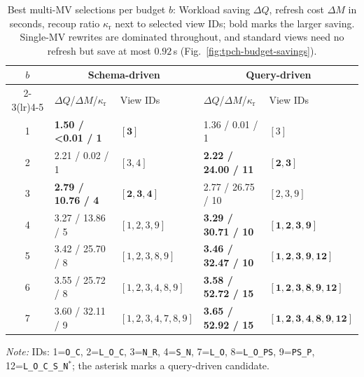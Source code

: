 \documentclass[sigconf]{acmart}
\begin{document}
\begin{table}[t]
  \centering
  \caption{Best multi-MV selections per budget $b$: Workload saving $\Delta Q$, refresh cost $\Delta M$ in seconds, recoup ratio $\kappa_{\mathrm r}$ next to selected view IDs; bold marks the larger saving. Single-MV rewrites are dominated throughout, and standard views need no refresh but save at most $0.92$\,s (Fig.~\ref{fig:tpch-budget-savings}).}
  \label{tab:tpch-budgets}
  \small
  \setlength{\tabcolsep}{4pt}
  \begin{tabular}{c l l l l}
    \toprule
    $b$ & \multicolumn{2}{c}{Schema-driven} & \multicolumn{2}{c}{Query-driven} \\
    \cmidrule(lr){2-3}\cmidrule(lr){4-5}
    & $\Delta Q$/$\Delta M$/$\kappa_{\mathrm r}$ & View IDs & $\Delta Q$/$\Delta M$/$\kappa_{\mathrm r}$ & View IDs \\ \midrule
    1 & \textbf{1.50 / <0.01 / 1} & {\scriptsize $\mathbf{[3]}$} & 1.36 / 0.01 / 1 & {\scriptsize $[3]$} \\
    2 & 2.21 / 0.02 / 1 & {\scriptsize $[3,4]$} & \textbf{2.22 / 24.00 / 11} & {\scriptsize $\mathbf{[2,3]}$} \\
    3 & \textbf{2.79 / 10.76 / 4} & {\scriptsize $\mathbf{[2,3,4]}$} & 2.77 / 26.75 / 10 & {\scriptsize $[2,3,9]$} \\
    4 & 3.27 / 13.86 / 5 & {\scriptsize $[1,2,3,9]$} & \textbf{3.29 / 30.71 / 10}
      & {\scriptsize $\mathbf{[1,2,3,9]}$} \\
    5 & 3.42 / 25.70 / 8 & {\scriptsize $[1,2,3,8,9]$} & \textbf{3.46 / 32.47 / 10} & {\scriptsize $\mathbf{[1,2,3,9,12]}$} \\
    6 & 3.55 / 25.72 / 8 & {\scriptsize $[1,2,3,4,8,9]$} & \textbf{3.58 / 52.72 / 15} & {\scriptsize $\mathbf{[1,2,3,8,9,12]}$} \\
    7 & 3.60 / 32.11 / 9 & {\scriptsize $[1,2,3,4,7,8,9]$} & \textbf{3.65 / 52.92 / 15}
       & {\scriptsize $\mathbf{[1,2,3,4,8,9,12]}$} \\
    \bottomrule
  \end{tabular}
  \vspace{2pt}
  \begin{center}
  {\small \textit{Note:} IDs: 1=\texttt{O\_C}, 2=\texttt{L\_O\_C}, 3=\texttt{N\_R}, 4=\texttt{S\_N}, 7=\texttt{L\_O}, 8=\texttt{L\_O\_PS}, 9=\texttt{PS\_P}, 12=\texttt{L\_O\_C\_S\_N}$^{*}$; the asterisk marks a query-driven candidate.}
  \end{center}
\end{table}
\end{document}
